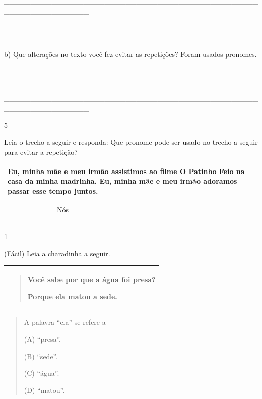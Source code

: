 \begin{itemize}
{{{\begin{itemize}
\begin{itemize}
\begin{itemize}
\_\_\_\_\_\_\_\_\_\_\_\_\_\_\_\_\_\_\_\_\_\_\_\_\_\_\_\_\_\_\_\_\_\_\_\_\_\_\_\_\_\_\_\_\_\_\_\_\_\_\_\_\_\_\_\_\_\_\_\_\_\_\_\_

\_\_\_\_\_\_\_\_\_\_\_\_\_\_\_\_\_\_\_\_\_\_\_\_\_\_\_\_\_\_\_\_\_\_\_\_\_\_\_\_\_\_\_\_\_\_\_\_\_\_\_\_\_\_\_\_\_\_\_\_\_\_\_\_

b) Que alterações no texto você fez evitar as repetições? Foram usados
pronomes.

\_\_\_\_\_\_\_\_\_\_\_\_\_\_\_\_\_\_\_\_\_\_\_\_\_\_\_\_\_\_\_\_\_\_\_\_\_\_\_\_\_\_\_\_\_\_\_\_\_\_\_\_\_\_\_\_\_\_\_\_\_\_\_\_

\_\_\_\_\_\_\_\_\_\_\_\_\_\_\_\_\_\_\_\_\_\_\_\_\_\_\_\_\_\_\_\_\_\_\_\_\_\_\_\_\_\_\_\_\_\_\_\_\_\_\_\_\_\_\_\_\_\_\_\_\_\_\_\_

\num{5}

Leia o trecho a seguir e responda: Que pronome pode ser usado no trecho
a seguir para evitar a repetição?

\begin{longtable}[]{@{}l@{}}
\toprule
Eu, minha mãe e meu irmão assistimos ao filme O Patinho Feio na casa da
minha madrinha. \textbf{Eu, minha mãe e meu irmão} adoramos passar esse
tempo juntos.\tabularnewline
\bottomrule
\end{longtable}

\_\_\_\_\_\_\_\_\_\_Nós\_\_\_\_\_\_\_\_\_\_\_\_\_\_\_\_\_\_\_\_\_\_\_\_\_\_\_\_\_\_\_\_\_\_\_\_\_\_\_\_\_\_\_\_\_\_\_\_\_\_\_\_\_\_


\num{1}

(Fácil) Leia a charadinha a seguir.

\begin{longtable}[]{@{}l@{}}
\toprule
\begin{minipage}[t]{0.97\columnwidth}\raggedright\strut
\begin{quote}
Você sabe por que a água foi presa?

Porque ela matou a sede.
\end{quote}\strut
\end{minipage}\tabularnewline
\bottomrule
\end{longtable}

\begin{quote}
A palavra ``ela'' se refere a

(A) ``presa''.

(B) ``sede''.

(C) ``água''.

(D) ``matou''.


\end{quote}
\end{itemize}
\end{itemize}
\end{itemize}}}}
\end{itemize}
